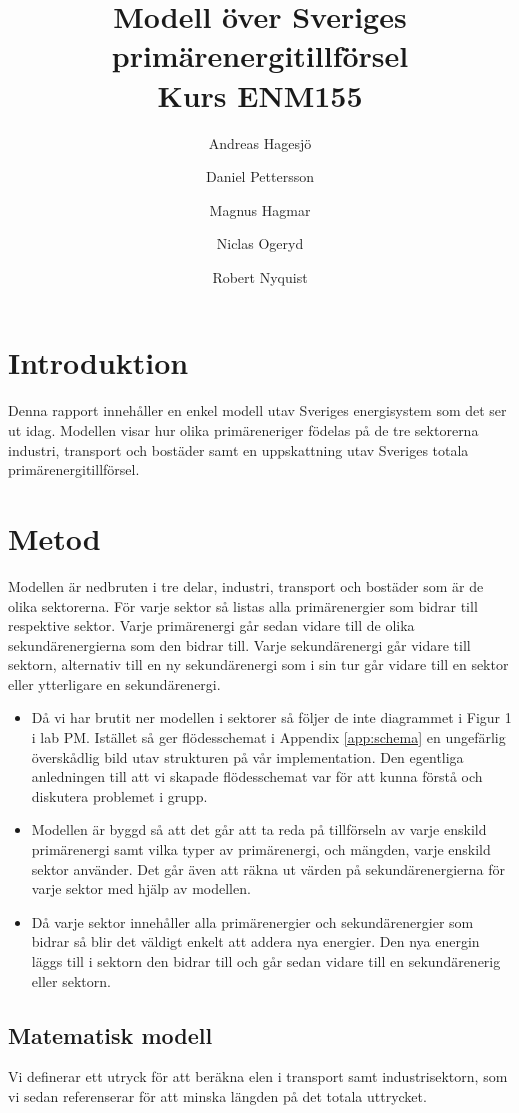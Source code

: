 \documentclass[a4paper,11pt,fleqn, titlepage]{article}
\author{Andreas Hagesjö \and Daniel Pettersson \and
Magnus Hagmar \and Niclas Ogeryd \and Robert Nyquist}
\title{Modell över Sveriges primärenergitillförsel \\ Kurs ENM155}
\begin{document}
\maketitle

\section{Introduktion}
Denna rapport innehåller en enkel modell utav Sveriges energisystem som det
ser ut idag. Modellen visar hur olika primäreneriger födelas på de tre
sektorerna industri, transport och bostäder samt en uppskattning utav
Sveriges totala primärenergitillförsel.


\section{Metod}
Modellen är nedbruten i tre delar, industri, transport och bostäder som är
de olika sektorerna. För varje sektor så listas alla primärenergier som
bidrar till respektive sektor. Varje primärenergi går sedan vidare till de
olika sekundärenergierna som den bidrar till. Varje sekundärenergi går
vidare till sektorn, alternativ till en ny sekundärenergi som i sin tur går
vidare till en sektor eller ytterligare en sekundärenergi.

\begin{itemize}
\item Då vi har brutit ner modellen i sektorer så följer de inte diagrammet
	i Figur 1 i lab PM. Istället så ger flödesschemat i Appendix
	\ref{app:schema} en ungefärlig överskådlig bild utav strukturen på vår
	implementation. Den egentliga anledningen till att vi skapade
	flödesschemat var för att kunna förstå och diskutera problemet i grupp.

\item Modellen är byggd så att det går att ta reda på tillförseln av varje
	enskild primärenergi samt vilka typer av primärenergi, och mängden,
	varje enskild sektor använder. Det går även att räkna ut värden på
	sekundärenergierna för varje sektor med hjälp av modellen.

\item Då varje sektor innehåller alla primärenergier och sekundärenergier
	som bidrar så blir det väldigt enkelt att addera nya energier. Den nya
	energin läggs till i sektorn den bidrar till och går sedan vidare till
	en sekundärenerig eller sektorn.
\end{itemize}

\subsection{Matematisk modell}
Vi definerar ett utryck för att beräkna elen i transport samt
industrisektorn, som vi sedan referenserar för att minska längden på det
totala uttrycket.
\end{document}
